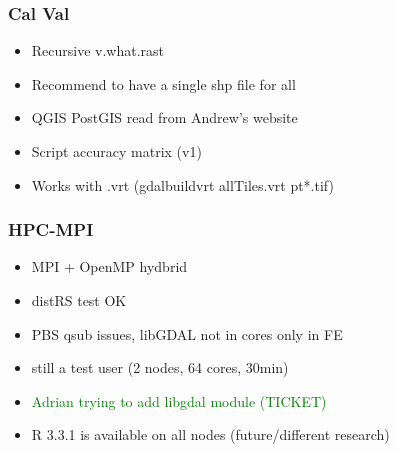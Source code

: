 \documentclass[serif,mathserif,aspectratio=169]{beamer}
\begin{document}

\begin{frame}
  \frametitle{Cal Val}
\begin{center}
\begin{itemize}
 \item Recursive v.what.rast
 \item Recommend to have a single shp file for all
 \item QGIS PostGIS read from Andrew's website
 \item Script accuracy matrix (v1)
 \item Works with .vrt (gdalbuildvrt allTiles.vrt pt*.tif) 
\end{itemize}
\end{center}
\end{frame}

%
%

\begin{frame}
  \frametitle{HPC-MPI}
\begin{center}
\begin{itemize}
 \item MPI + OpenMP hydbrid
 \item distRS test OK
 \item PBS qsub issues, libGDAL not in cores only in FE 
 \item still a test user (2 nodes, 64 cores, 30min)
 \item \textcolor{green}{Adrian trying to add libgdal module (TICKET)}
 \item R 3.3.1 is available on all nodes (future/different research)
\end{itemize}
\end{center}
\end{frame}



%
\end{document}
